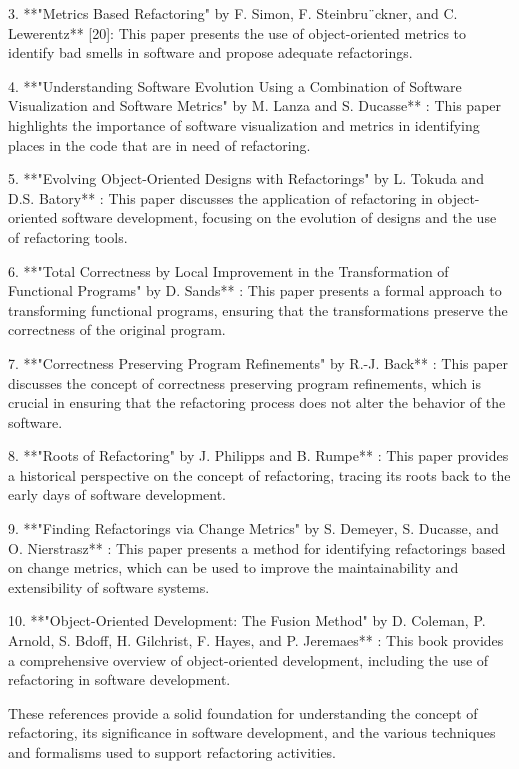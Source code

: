3. **"Metrics Based Refactoring" by F. Simon, F. Steinbru¨ckner, and C. Lewerentz** [20]: This paper presents the use of object-oriented metrics to identify bad smells in software and propose adequate refactorings.

4. **"Understanding Software Evolution Using a Combination of Software Visualization and Software Metrics" by M. Lanza and S. Ducasse** : This paper highlights the importance of software visualization and metrics in identifying places in the code that are in need of refactoring.

5. **"Evolving Object-Oriented Designs with Refactorings" by L. Tokuda and D.S. Batory** : This paper discusses the application of refactoring in object-oriented software development, focusing on the evolution of designs and the use of refactoring tools.

6. **"Total Correctness by Local Improvement in the Transformation of Functional Programs" by D. Sands** : This paper presents a formal approach to transforming functional programs, ensuring that the transformations preserve the correctness of the original program.

7. **"Correctness Preserving Program Refinements" by R.-J. Back** : This paper discusses the concept of correctness preserving program refinements, which is crucial in ensuring that the refactoring process does not alter the behavior of the software.

8. **"Roots of Refactoring" by J. Philipps and B. Rumpe** : This paper provides a historical perspective on the concept of refactoring, tracing its roots back to the early days of software development.

9. **"Finding Refactorings via Change Metrics" by S. Demeyer, S. Ducasse, and O. Nierstrasz** : This paper presents a method for identifying refactorings based on change metrics, which can be used to improve the maintainability and extensibility of software systems.

10. **"Object-Oriented Development: The Fusion Method" by D. Coleman, P. Arnold, S. Bdoff, H. Gilchrist, F. Hayes, and P. Jeremaes** : This book provides a comprehensive overview of object-oriented development, including the use of refactoring in software development.

These references provide a solid foundation for understanding the concept of refactoring, its significance in software development, and the various techniques and formalisms used to support refactoring activities.

